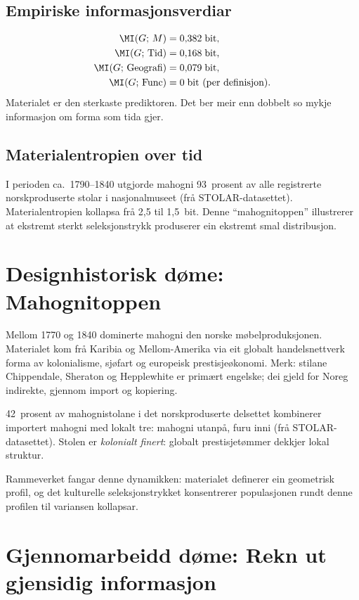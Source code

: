 \subsection{Empiriske informasjonsverdiar}

\begin{align*}
  \MI(G;\, M) &= 0{,}382 \;\text{bit}, \\
  \MI(G;\, \mathrm{Tid}) &= 0{,}168 \;\text{bit}, \\
  \MI(G;\, \mathrm{Geografi}) &= 0{,}079 \;\text{bit}, \\
  \MI(G;\, \mathrm{Func}) &= 0 \;\text{bit (per definisjon).}
\end{align*}
Materialet er den sterkaste prediktoren. Det ber meir enn dobbelt
so mykje informasjon om forma som tida gjer.

\subsection{Materialentropien over tid}

I perioden ca.~1790--1840 utgjorde mahogni 93~prosent av alle
registrerte norskproduserte stolar i nasjonalmuseet
(frå STOLAR-datasettet). Materialentropien kollapsa frå 2{,}5 til
1{,}5~bit. Denne ``mahognitoppen'' illustrerer at ekstremt sterkt
seleksjonstrykk produserer ein ekstremt smal distribusjon.


\section{Designhistorisk døme: Mahognitoppen}

Mellom 1770 og 1840 dominerte mahogni den norske møbelproduksjonen.
Materialet kom frå Karibia og Mellom-Amerika via eit globalt
handelsnettverk forma av kolonialisme, sjøfart og europeisk
prestisjeøkonomi. Merk: stilane Chippendale, Sheraton og
Hepplewhite er primært engelske; dei gjeld for Noreg indirekte,
gjennom import og kopiering.

42~prosent av mahognistolane i det norskproduserte delsettet
kombinerer importert mahogni med lokalt tre: mahogni utanpå, furu
inni (frå STOLAR-datasettet). Stolen er \emph{kolonialt finert}:
globalt prestisjetømmer dekkjer lokal struktur.

Rammeverket fangar denne dynamikken: materialet definerer ein
geometrisk profil, og det kulturelle seleksjonstrykket
konsentrerer populasjonen rundt denne profilen til variansen
kollapsar.


\section{Gjennomarbeidd døme: Rekn ut gjensidig informasjon}

